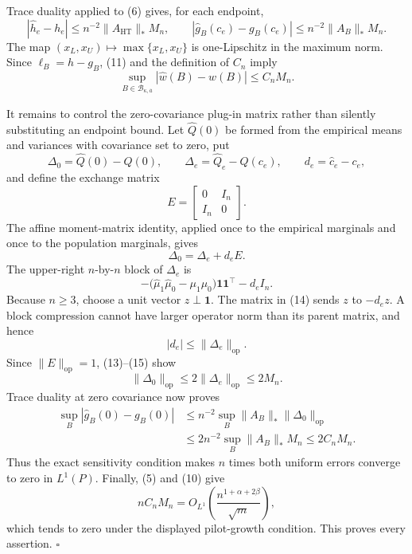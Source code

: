 Trace duality applied to (6) gives, for each endpoint,
\[
|\widehat h_e-h_e|
\le n^{-2}\lVert A_{\mathrm{HT}}\rVert_*M_n,
\qquad
|\widehat g_B(c_e)-g_B(c_e)|
\le n^{-2}\lVert A_B\rVert_*M_n.
\tag{11}
\]
The map \((x_L,x_U)\mapsto\max\{x_L,x_U\}\) is one-Lipschitz in the maximum norm.  Since \(\ell_B=h-g_B\), (11) and the definition of \(C_n\) imply
\[
\sup_{B\in\mathcal B_{\kappa,\overline a}}
|\widehat w(B)-w(B)|\le C_nM_n.
\tag{12}
\]

It remains to control the zero-covariance plug-in matrix rather than silently substituting an endpoint bound.  Let \(\widehat Q(0)\) be formed from the empirical means and variances with covariance set to zero, put
\[
\Delta_0=\widehat Q(0)-Q(0),
\qquad
\Delta_e=\widehat Q_e-Q(c_e),
\qquad
d_e=\widehat c_e-c_e,
\]
and define the exchange matrix
\[
E=\begin{bmatrix}0&I_n\\I_n&0\end{bmatrix}.
\]
The affine moment-matrix identity, applied once to the empirical marginals and once to the population marginals, gives
\[
\Delta_0=\Delta_e+d_eE.
\tag{13}
\]
The upper-right \(n\)-by-\(n\) block of \(\Delta_e\) is
\[
-\bigl(\widehat\mu_1\widehat\mu_0-\mu_1\mu_0\bigr)
\mathbf1\mathbf1^{\top}-d_eI_n.
\tag{14}
\]
Because \(n\ge3\), choose a unit vector \(z\perp\mathbf1\).  The matrix in (14) sends \(z\) to \(-d_ez\).  A block compression cannot have larger operator norm than its parent matrix, and hence
\[
|d_e|\le\lVert\Delta_e\rVert_{\mathrm{op}}.
\tag{15}
\]
Since \(\lVert E\rVert_{\mathrm{op}}=1\), (13)--(15) show
\[
\lVert\Delta_0\rVert_{\mathrm{op}}
\le2\lVert\Delta_e\rVert_{\mathrm{op}}
\le2M_n.
\tag{16}
\]
Trace duality at zero covariance now proves
\[
\begin{aligned}
\sup_B|\widehat g_B(0)-g_B(0)|
&\le n^{-2}\sup_B\lVert A_B\rVert_*
\lVert\Delta_0\rVert_{\mathrm{op}}\\
&\le2n^{-2}\sup_B\lVert A_B\rVert_*M_n
\le2C_nM_n.
\end{aligned}
\tag{17}
\]
Thus the exact sensitivity condition makes \(n\) times both uniform errors converge to zero in \(L^1(P)\).  Finally, (5) and (10) give
\[
nC_nM_n
=O_{L^1}\!\left(
\frac{n^{1+\alpha+2\beta}}{\sqrt m}
\right),
\]
which tends to zero under the displayed pilot-growth condition.  This proves every assertion. \(\square\)